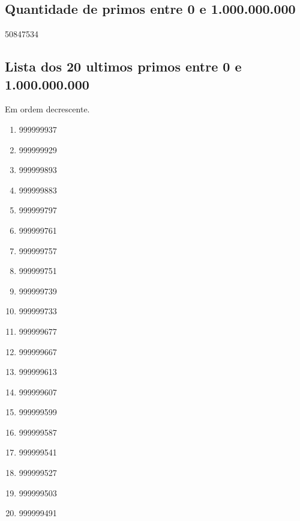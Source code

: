 \documentclass[a4paper, 12 pt]{article}
\begin{document}
\subsection{Quantidade de primos entre 0 e 1.000.000.000}
50847534

\subsection{Lista dos 20 ultimos primos entre 0 e 1.000.000.000}

Em ordem decrescente.

\begin{multicols}{4}
  \begin{enumerate}
    \item 999999937
    \item 999999929
    \item 999999893
    \item 999999883
    \item 999999797
    \item 999999761
    \item 999999757
    \item 999999751
    \item 999999739
    \item 999999733
    \item 999999677
    \item 999999667
    \item 999999613
    \item 999999607
    \item 999999599
    \item 999999587
    \item 999999541
    \item 999999527
    \item 999999503
    \item 999999491
  \end{enumerate}
\end{multicols}
\end{document}
